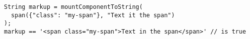 \begin{verbatim}
String markup = mountComponentToString(
  span({"class": "my-span"}, "Text it the span")
);
markup == '<span class="my-span">Text in the span</span>' // is true
\end{verbatim}
